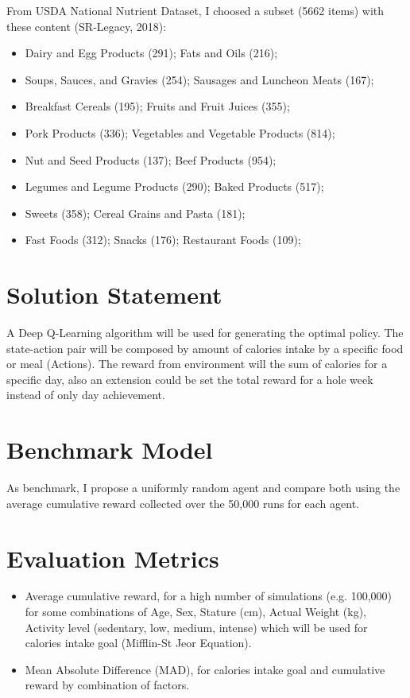 \documentclass{article}
\begin{document}
From USDA National Nutrient Dataset, I choosed a subset (5662 items) with these content (SR-Legacy, 2018):

\begin{itemize}
    \item Dairy and Egg Products (291); Fats and Oils (216);
    \item Soups, Sauces, and Gravies (254); Sausages and Luncheon Meats (167);
    \item Breakfast Cereals (195); Fruits and Fruit Juices (355);
    \item Pork Products (336); Vegetables and Vegetable Products (814);
    \item Nut and Seed Products (137); Beef Products (954);
    \item Legumes and Legume Products (290); Baked Products (517);
    \item Sweets (358); Cereal Grains and Pasta (181);
    \item Fast Foods (312); Snacks (176); Restaurant Foods (109);
\end{itemize}

\section{Solution Statement}

A Deep Q-Learning algorithm will be used for generating the optimal policy. The state-action pair 
will be composed by amount of calories intake by a specific food or meal (Actions). The reward from 
environment will the sum of calories for a specific day, also an extension could be set the total 
reward for a hole week instead of only day achievement.

\section{Benchmark Model}

As benchmark, I propose a uniformly random agent and compare both using the average cumulative 
reward collected over the 50,000 runs for each agent.

\section{Evaluation Metrics}

\begin{itemize}
    \item Average cumulative reward, for a high number of simulations (e.g. 100,000) for 
    some combinations of Age, Sex, Stature (cm), Actual Weight (kg), Activity level 
    (sedentary, low, medium, intense) which will be used for calories intake goal 
    (Mifflin-St Jeor Equation).
    \item Mean Absolute Difference (MAD), for calories intake goal and cumulative 
    reward by combination of factors.
\end{itemize}
\end{document}
